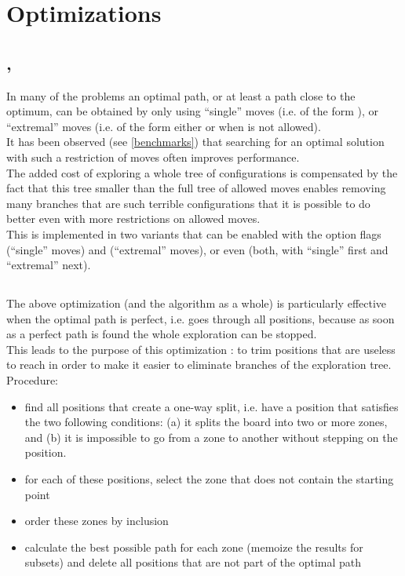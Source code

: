 \section{Optimizations}


\subsection{, }

In many of the problems an optimal path, or at least a path close to the optimum,
can be obtained by only using ``single'' moves (i.e. of the form ),
or ``extremal'' moves (i.e. of the form either  or  when
 is not allowed).\\

It has been observed (see \ref{benchmarks}) that searching for an optimal
solution with such a restriction of moves often improves performance.\\
The added cost of exploring a whole tree of configurations is compensated
by the fact that this tree smaller than the full tree of allowed moves
enables removing many branches that are such terrible configurations
that it is possible to do better even with more restrictions on allowed moves.\\

This is implemented in two variants that can be enabled with the option flags
 (``single'' moves) and  (``extremal'' moves), or even
 (both, with ``single'' first and ``extremal'' next).\\


\subsection{}

The above optimization (and the algorithm as a whole) is particularly effective
when the optimal path is perfect, i.e. goes through all positions, because
as soon as a perfect path is found the whole exploration can be stopped.\\
This leads to the purpose of this optimization : to trim positions that
are useless to reach in order to make it easier to eliminate branches of the
exploration tree.\\

Procedure:
\begin{itemize}
    \item find all positions that create a one-way split, i.e. have a position
    that satisfies the two following conditions: (a) it splits the board into
    two or more zones, and (b) it is impossible to go from a zone to another
    without stepping on the position.
    \item for each of these positions, select the zone that does not
    contain the starting point
    \item order these zones by inclusion
    \item calculate the best possible path for each zone (memoize the results
    for subsets) and delete all positions that are not part of the optimal path
\end{itemize}~\\

